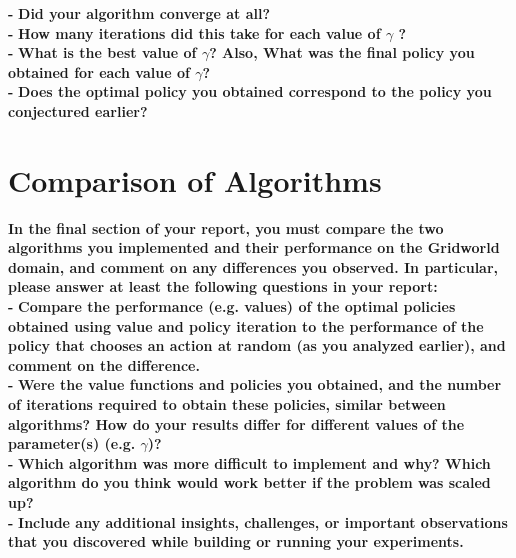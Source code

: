 \documentclass[11pt]{article}
\begin{document}
\noindent
\textbf{-}
\noindent
\textbf{Did your algorithm converge at all?}
\\

\noindent
\textbf{-}
\noindent
\textbf{How many iterations did this take for each value of $\gamma$ ?}
\\

\noindent
\textbf{-}
\noindent
\textbf{What is the best value of $\gamma$? Also, What was the final policy you
obtained for each value of $\gamma$?}
\\

\noindent
\textbf{-}
\noindent
\textbf{Does the optimal policy you obtained correspond to the policy you
conjectured earlier?}
\\

\section{Comparison of Algorithms}
\textbf{In the final section of your report, you must compare the two algorithms you
implemented and their performance on the Gridworld domain, and comment on any
differences you observed. In particular, please answer at least the following
questions in your report:}
\\

\noindent
\textbf{-}
\noindent
\textbf{Compare the performance (e.g. values) of the optimal policies obtained
using value and policy iteration to the performance of the policy that chooses
an action at random (as you analyzed earlier), and comment on the difference.}
\\

\noindent
\textbf{-}
\noindent
\textbf{Were the value functions and policies you obtained, and the number of
iterations required to obtain these policies, similar between algorithms? How do
your results differ for different values of the parameter(s) (e.g. $\gamma$)?}
\\

\noindent
\textbf{-}
\noindent
\textbf{Which algorithm was more difficult to implement and why? Which algorithm
do you think would work better if the problem was scaled up?}
\\

\noindent
\textbf{-}
\noindent
\textbf{Include any additional insights, challenges, 
or important observations that you discovered while building or
 running your experiments.}
\\
\end{document}
